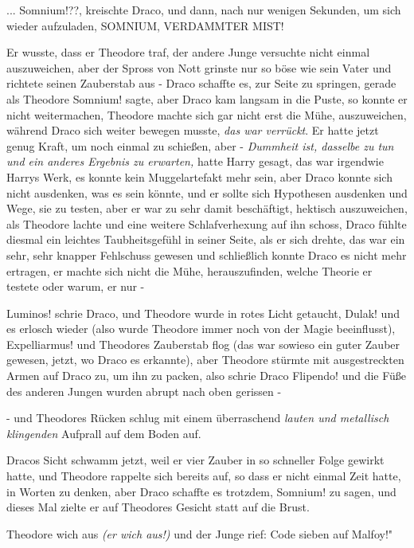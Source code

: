 ... \glqq{}Somnium!??\grqq{}, kreischte Draco, und dann, nach nur wenigen
Sekunden, um sich wieder aufzuladen, \glqq{}SOMNIUM, VERDAMMTER MIST!\grqq{}

Er wusste, dass er Theodore traf, der andere Junge versuchte nicht einmal
auszuweichen, aber der Spross von Nott grinste nur so böse wie sein Vater und
richtete seinen Zauberstab aus - Draco schaffte es, zur Seite zu springen,
gerade als Theodore \glqq{}Somnium!\grqq{} sagte, aber Draco kam langsam in die
Puste, so konnte er nicht weitermachen, Theodore machte sich gar nicht erst die
Mühe, auszuweichen, während Draco sich weiter bewegen musste, \emph{das war
verrückt}. Er hatte jetzt genug Kraft, um noch einmal zu schießen, aber -
\emph{Dummheit ist, dasselbe zu tun und ein anderes Ergebnis zu erwarten,} hatte
Harry gesagt, das war irgendwie Harrys Werk, es konnte kein Muggelartefakt mehr
sein, aber Draco konnte sich nicht ausdenken, was es sein könnte, und er sollte
sich Hypothesen ausdenken und Wege, sie zu testen, aber er war zu sehr damit
beschäftigt, hektisch auszuweichen, als Theodore lachte und eine weitere
Schlafverhexung auf ihn schoss, Draco fühlte diesmal ein leichtes
Taubheitsgefühl in seiner Seite, als er sich drehte, das war ein sehr, sehr
knapper Fehlschuss gewesen und schließlich konnte Draco es nicht mehr ertragen,
er machte sich nicht die Mühe, herauszufinden, welche Theorie er testete oder
warum, er nur -

\glqq{}Luminos!\grqq{} schrie Draco, und Theodore wurde in rotes Licht getaucht,
\glqq{}Dulak!\grqq{} und es erlosch wieder (also wurde Theodore immer noch von
der Magie beeinflusst), \glqq{}Expelliarmus!\grqq{} und Theodores Zauberstab flog
(das war sowieso ein guter Zauber gewesen, jetzt, wo Draco es erkannte), aber
Theodore stürmte mit ausgestreckten Armen auf Draco zu, um ihn zu packen, also
schrie Draco \glqq{}Flipendo!\grqq{} und die Füße des anderen Jungen wurden
abrupt nach oben gerissen -

- und Theodores Rücken schlug mit einem überraschend \emph{lauten und metallisch
klingenden} Aufprall auf dem Boden auf.

Dracos Sicht schwamm jetzt, weil er vier Zauber in so schneller Folge gewirkt
hatte, und Theodore rappelte sich bereits auf, so dass er nicht einmal Zeit
hatte, in Worten zu denken, aber Draco schaffte es trotzdem, \glqq{}
Somnium!\grqq{} zu sagen, und dieses Mal zielte er auf Theodores Gesicht statt
auf die Brust.

Theodore wich aus \emph{(er wich aus!)} und der Junge rief: \glqq{}Code sieben
auf Malfoy!"

